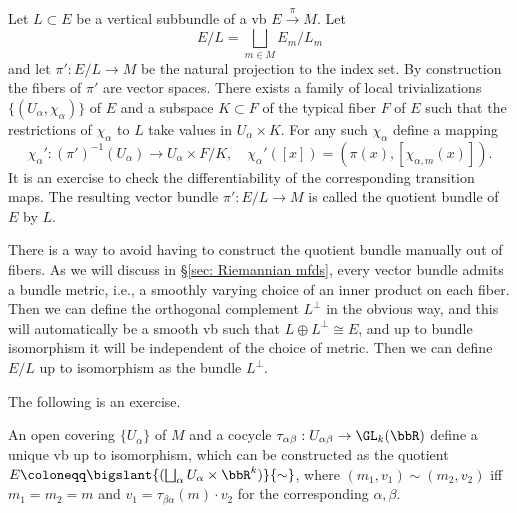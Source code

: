 \begin{defn}
    Let $L\subset E$ be a vertical subbundle of a \gls{vb} $E\overset{\pi}{\to}M$. Let
    \[E\slash L=\bigsqcup_{m\in M}E_m\slash L_m\]
    and let $\pi':E\slash L\to M$ be the natural projection to the index set. By construction the fibers of $\pi'$ are vector spaces. There exists a family of local trivializations $\{(U_\alpha,\chi_\alpha)\}$ of $E$ and a subspace $K\subset F$ of the typical fiber $F$ of $E$ such that the restrictions of $\chi_\alpha$ to $L$ take values in $U_\alpha\times K$. For any such $\chi_\alpha$ define a mapping
    \[\chi_\alpha':(\pi')^{-1}(U_\alpha)\to U_\alpha\times F\slash K,\quad \chi_\alpha'([x])=(\pi(x),[\chi_{\alpha,m}(x)]).\]
    It is an exercise to check the differentiability of the corresponding transition maps. The resulting vector bundle $\pi':E\slash L\to M$ is called the quotient bundle of $E$ by $L$.
\end{defn}
\begin{rem}
    There is a way to avoid having to construct the quotient bundle manually out of fibers. As we will discuss in \S\ref{sec: Riemannian mfds}, every vector bundle admits a bundle metric, i.e., a smoothly varying choice of an inner product on each fiber. Then we can define the orthogonal complement $L^\perp$ in the obvious way, and this will automatically be a smooth \gls{vb} such that $L\oplus L^\perp\cong E$, and up to bundle isomorphism it will be independent of the choice of metric. Then we can define $E\slash L$ up to isomorphism as the bundle $L^\perp$.
\end{rem}


The following is an exercise.
\begin{prop}
    An open covering $\{U_\alpha\}$ of $M$ and a cocycle $\tau_{\alpha\beta}:U_{\alpha\beta}\to\GL_k (\bbR )$ define a unique \gls{vb} up to isomorphism, which can be constructed as the quotient $E\coloneqq \bigslant{(\bigsqcup_\alpha U_\alpha \times \bbR^k)}{\sim}$, where $(m_1,v_1)\sim(m_2,v_2)$ iff $m_1=m_2=m$ and $v_1=\tau_{\beta\alpha}(m)\cdot v_2$ for the corresponding $\alpha,\beta$.
\end{prop}




